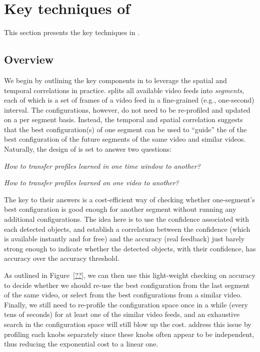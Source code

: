 \section{Key techniques of \name}
\label{sec:algorithm}
This section presents the key techniques in \name.

\subsection{Overview}

We begin by outlining the key components in \name to leverage the 
spatial and temporal correlations in practice. 
\name splits all available video feeds into {\em segments}, each 
of which is a set of frames of a video feed in a fine-grained 
(e.g., one-second) interval. 
The \nn configurations, however, do not need to be re-profiled 
and updated on a per segment basis.
Instead, the temporal and spatial correlation suggests that the 
best configuration(s) of one segment can be used to ``guide'' the
of the best configuration of the future segments of the same video 
and similar videos.
Naturally, the design of \name is set to answer two questions:
\begin{packeditemize}
\item {\em How to transfer profiles learned in one time window to 
another?}
\item {\em How to transfer profiles learned on one video to another?}
\end{packeditemize}

The key to their answers is a cost-efficient way of checking 
whether one-segment's best configuration is good enough for 
another segment without running any additional configurations.
The idea here is to use the confidence associated with each 
detected objects, and establish a correlation between the 
confidence (which is available instantly and for free) and the
accuracy (real feedback) just barely strong enough to indicate
whether the  detected objects, with their confidence, has 
accuracy over the accuracy threshold. 

As outlined in Figure~\ref{??}, we can then use this light-weight
checking on accuracy to decide whether we should re-use the 
best configuration from the last segment of the same video, or 
select from the best configurations from a similar video.
Finally, we still need to re-profile the configuration space 
once in a while (every tens of seconds) for at least one of the 
similar video feeds, and an exhaustive search in the 
configuration space will still blow up the cost. 
\name address this issue by profiling each knobs separately 
since these knobs often appear to be independent, thus reducing
the exponential cost to a linear one.


